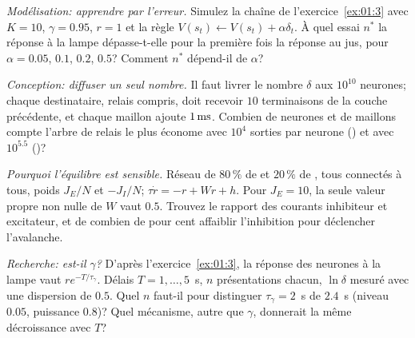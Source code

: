 \begin{exercise}[\lvlB]
\label{ex:01:4}
\emph{Modélisation: apprendre par l'erreur.} Simulez la chaîne de l'exercice~\ref{ex:01:3} avec $K=10$, $\gamma=0.95$, $r=1$ et la règle $V(s_t)\leftarrow V(s_t)+\alpha\delta_t$. À quel essai $n^*$ la réponse à la lampe dépasse-t-elle pour la première fois la réponse au jus, pour $\alpha=0.05$, $0.1$, $0.2$, $0.5$? Comment $n^*$ dépend-il de $\alpha$?
\end{exercise}

\begin{exercise}[\lvlB]
\label{ex:01:5}
\emph{Conception: diffuser un seul nombre.} Il faut livrer le nombre $\delta$ aux $10^{10}$ neurones; chaque destinataire, relais compris, doit recevoir $10$ terminaisons de la couche précédente, et chaque maillon ajoute $1\,\text{ms}$. Combien de neurones et de maillons compte l'arbre de relais le plus économe avec $10^4$ sorties par neurone () et avec $10^{5.5}$ ()?
\end{exercise}

\begin{exercise}[\lvlB]
\label{ex:01:6}
\emph{Pourquoi l'équilibre est sensible.} Réseau de $80\,\%$ de  et $20\,\%$ de , tous connectés à tous, poids $J_E/N$ et $-J_I/N$; $\tau\dot r=-r+Wr+h$. Pour $J_E=10$, la seule valeur propre non nulle de $W$ vaut $0.5$. Trouvez le rapport des courants inhibiteur et excitateur, et de combien de pour cent affaiblir l'inhibition pour déclencher l'avalanche.
\end{exercise}

\begin{exercise}[\lvlC]
\label{ex:01:7}
\emph{Recherche:  est-il $\gamma$?} D'après l'exercice~\ref{ex:01:3}, la réponse des neurones  à la lampe vaut $re^{-T/\tau_\gamma}$. Délais $T=1,\dots,5$~s, $n$ présentations chacun, $\ln\delta$ mesuré avec une dispersion de $0.5$. Quel $n$ faut-il pour distinguer $\tau_\gamma=2$~s de $2.4$~s (niveau $0.05$, puissance $0.8$)? Quel mécanisme, autre que $\gamma$, donnerait la même décroissance avec $T$?
\end{exercise}
